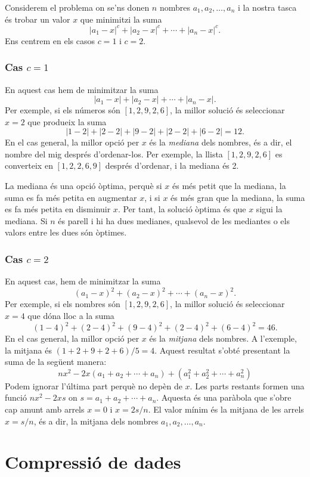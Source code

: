 Considerem el problema on
se'ns donen $n$ nombres $a_1,a_2,\ldots,a_n$
i la nostra tasca és trobar un valor $x$
que minimitzi la suma
\[|a_1-x|^c+|a_2-x|^c+\cdots+|a_n-x|^c.\]
Ens centrem en els casos $c=1$ i $c=2$.

\subsubsection{Cas $c=1$}

En aquest cas hem de minimitzar la suma
\[|a_1-x|+|a_2-x|+\cdots+|a_n-x|.\]
Per exemple, si els números són $[1,2,9,2,6]$,
la millor solució és seleccionar $x=2$
que produeix la suma
\[
|1-2|+|2-2|+|9-2|+|2-2|+|6-2|=12.
\]
En el cas general, la millor opció per $x$
és la \textit{mediana} dels nombres,
és a dir, el nombre del mig després d'ordenar-los.
Per exemple, la llista $[1,2,9,2,6]$
es converteix en $[1,2,2,6,9]$ després d'ordenar,
i la mediana és 2.

La mediana és una opció òptima,
perquè si $x$ és més petit que la mediana,
la suma es fa més petita en augmentar $x$,
i si $x$ és més gran que la mediana,
la suma es fa més petita en disminuir $x$.
Per tant, la solució òptima és que $x$
sigui la mediana.
Si $n$ és parell i hi ha dues medianes,
qualsevol de les mediantes o els valors entre les dues
són òptimes.

\subsubsection{Cas $c=2$}

En aquest cas, hem de minimitzar la suma
\[(a_1-x)^2+(a_2-x)^2+\cdots+(a_n-x)^2.\]
Per exemple, si els nombres són $[1,2,9,2,6]$,
la millor solució és seleccionar $x=4$
que dóna lloc a la suma
\[
(1-4)^2+(2-4)^2+(9-4)^2+(2-4)^2+(6-4)^2=46.
\]
En el cas general, la millor opció per $x$
és la \emph{mitjana} dels nombres.
A l'exemple, la mitjana és $(1+2+9+2+6)/5=4$.
Aquest resultat s'obté presentant
la suma de la següent manera:
\[
nx^2 - 2x(a_1+a_2+\cdots+a_n) + (a_1^2+a_2^2+\cdots+a_n^2)
\]
Podem ignorar l'última part perquè no depèn de $x$.
Les parts restants formen una funció
$nx^2-2xs$ on $s=a_1+a_2+\cdots+a_n$.
Aquesta és una paràbola que s'obre cap amunt
amb arrels $x=0$ i $x=2s/n$. El valor mínim
és la mitjana de les arrels $x=s/n$, és a dir,
la mitjana dels nombres $a_1,a_2,\ldots,a_n$.

\section{Compressió de dades}


